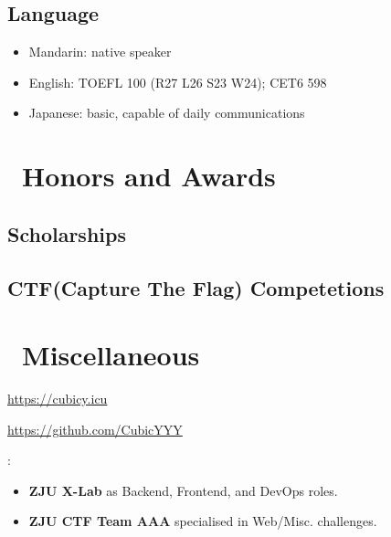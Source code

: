 \documentclass{resume}
\begin{document}
\subsection{Language}
\begin{itemize}[parsep=0.5ex]
  \item Mandarin: native speaker
  \item English: TOEFL 100 (R27 L26 S23 W24); CET6 598
  \item Japanese: basic, capable of daily communications
\end{itemize}

\section{\faHeartO\ Honors and Awards}
\subsection{Scholarships}

\subsection{CTF(Capture The Flag) Competetions}

\section{\faInfo\ Miscellaneous}
\begin{description}[parsep=0.5ex]
  \item[Personal Blog] \url{https://cubicy.icu}
  \item[GitHub] \url{https://github.com/CubicYYY}
  \item[Team Involvement] :
  \begin{itemize}
      \item \textbf{ZJU X-Lab} as Backend, Frontend, and DevOps roles.
      \item \textbf{ZJU CTF Team AAA} specialised in Web/Misc. challenges.
  \end{itemize}
\end{description}
%
%
\end{document}
